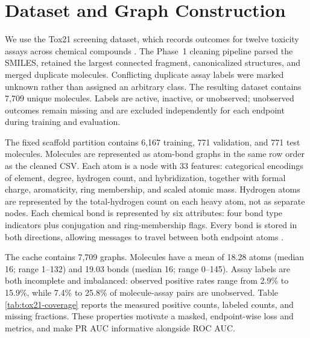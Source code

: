 \section{Dataset and Graph Construction}
\label{sec:dataset-graph}

We use the Tox21 screening dataset, which records outcomes for twelve toxicity
assays across chemical compounds \cite{wu2018moleculenet,huang2016tox21}. The
Phase~1 cleaning pipeline parsed the SMILES, retained the largest connected
fragment, canonicalized structures, and merged duplicate molecules. Conflicting
duplicate assay labels were marked unknown rather than assigned an arbitrary
class. The resulting dataset contains 7,709 unique molecules. Labels are
active, inactive, or unobserved; unobserved outcomes remain missing and are
excluded independently for each endpoint during training and evaluation.

The fixed scaffold partition contains 6,167 training, 771 validation, and 771
test molecules. Molecules are represented as atom-bond graphs in the same row
order as the cleaned CSV. Each atom is a node with 33 features: categorical
encodings of element, degree, hydrogen count, and hybridization, together with
formal charge, aromaticity, ring membership, and scaled atomic mass. Hydrogen
atoms are represented by the total-hydrogen count on each heavy atom, not as
separate nodes. Each chemical bond is represented by six attributes: four bond
type indicators plus conjugation and ring-membership flags. Every bond is
stored in both directions, allowing messages to travel between both endpoint
atoms \cite{gilmer2017neural}.

The cache contains 7,709 graphs. Molecules have a mean of 18.28 atoms (median
16; range 1--132) and 19.03 bonds (median 16; range 0--145). Assay labels are
both incomplete and imbalanced: observed positive rates range from 2.9\% to
15.9\%, while 7.4\% to 25.8\% of molecule-assay pairs are unobserved. Table
\ref{tab:tox21-coverage} reports the measured positive counts, labeled counts,
and missing fractions. These properties motivate a masked, endpoint-wise loss
and metrics, and make PR AUC informative alongside ROC AUC.


